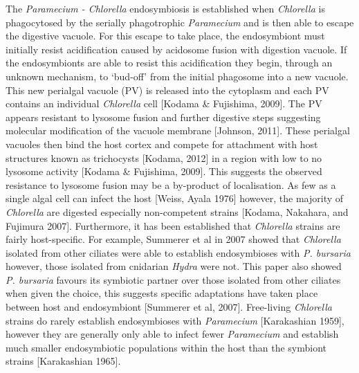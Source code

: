 The \textit{Paramecium - Chlorella} endosymbiosis is established when \textit{Chlorella} is phagocytosed by the serially phagotrophic \textit{Paramecium} and is then able to escape the digestive vacuole.  
For this escape to take place, the endosymbiont must initially resist acidification caused by acidosome fusion with digestion vacuole.  
If the endosymbionts are able to resist this acidification they begin, through an unknown mechanism, to `bud-off' from the initial phagosome into a new vacuole.  
This new perialgal vacuole (PV) is released into the cytoplasm and each PV contains an individual \textit{Chlorella} cell [Kodama \& Fujishima, 2009].
The PV appears resistant to lysosome fusion and further digestive steps suggesting molecular modification of the vacuole membrane [Johnson, 2011]. 
These perialgal vacuoles then bind the host cortex and compete for attachment with host structures known as trichocysts [Kodama, 2012] in a region with low to no lysosome activity [Kodama \& Fujishima, 2009].  
This suggests the observed resistance to lysosome fusion may be a by-product of localisation. 
As few as a single algal cell can infect the host [Weiss, Ayala 1976] however, the majority of \textit{Chlorella} are digested especially non-competent strains [Kodama, Nakahara, and Fujimura 2007].  
Furthermore, it has been established that \textit{Chlorella} strains are fairly host-specific.  
For example, Summerer et al in 2007 showed that \textit{Chlorella} isolated from other ciliates were able to establish endosymbioses with \textit{P. bursaria} however, those isolated from cnidarian \textit{Hydra} were not.  
This paper also showed \textit{P. bursaria} favours its symbiotic partner over those isolated from other ciliates when given the choice, this suggests specific adaptations have taken place between host and endosymbiont [Summerer et al, 2007].
Free-living \textit{Chlorella} strains do rarely establish endosymbioses with \textit{Paramecium} [Karakashian 1959], however they are generally only able to infect fewer \textit{Paramecium} and establish much smaller endosymbiotic populations within the host than the symbiont strains [Karakashian 1965].


